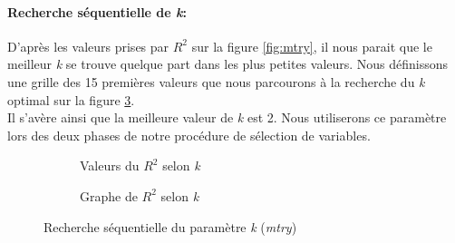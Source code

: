 	\paragraph{Recherche séquentielle de \textit{k}:} D'après les valeurs prises par $R^2$ sur la figure \ref{fig:mtry}, il nous parait que le meilleur \textit{k} se trouve quelque part dans les plus petites valeurs. Nous définissons une grille des 15 premières valeurs que nous parcourons à la recherche du \textit{k} optimal sur la figure \ref{fig:seqtry}.\\
	Il s'avère ainsi que la meilleure valeur de \textit{k} est 2. Nous utiliserons ce paramètre lors des deux phases de notre procédure de sélection de variables.
	\begin{figure}[H]
					\begin{subfigure}{.5\textwidth}
						\centering
						\caption{Valeurs du $R^2$ selon \textit{k} }
						\label{fig:reqtry1}
					\end{subfigure}
					\begin{subfigure}{.5\textwidth}
							\centering
							\caption{Graphe de $R^2$ selon \textit{k}}
							\label{fig:seqtry2}
					\end{subfigure}
					\caption{Recherche séquentielle du paramètre \textit{k} (\textit{mtry})}
					\label{fig:seqtry}
						\end{figure}

